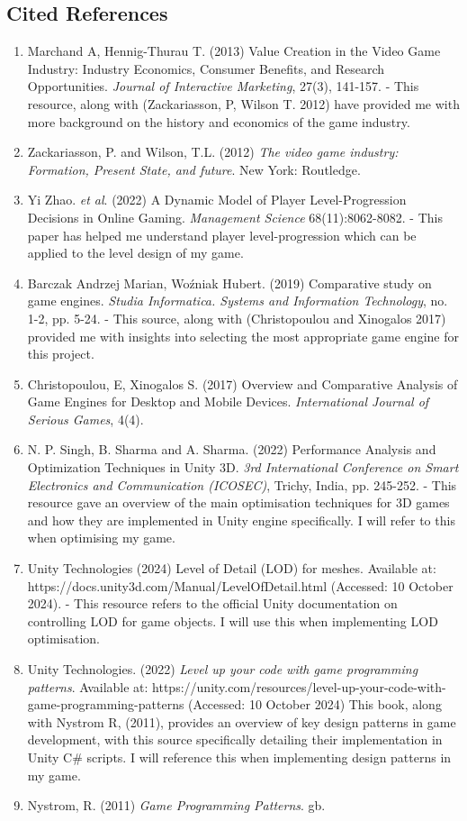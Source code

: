 \documentclass[12pt]{article}
\begin{document}
	\subsection{Cited References}
	\begin{enumerate}
	\item Marchand A, Hennig-Thurau T. (2013) Value Creation in the Video Game Industry: Industry Economics, Consumer Benefits, and Research Opportunities. \textit{Journal of Interactive Marketing}, 27(3), 141-157. - This resource, along with (Zackariasson, P, Wilson T. 2012) have provided me with more background on the history and economics of the game industry.
	\item Zackariasson, P. and Wilson, T.L. (2012) \textit{The video game industry: Formation, Present State, and future}. New York: Routledge.
	\item Yi Zhao. \textit{et al}. (2022) A Dynamic Model of Player Level-Progression Decisions in Online Gaming. \textit{Management Science} 68(11):8062-8082. - This paper has helped me understand player level-progression which can be applied to the level design of my game.
	\item Barczak Andrzej Marian, Woźniak Hubert. (2019) Comparative study on game engines. \textit{Studia Informatica. Systems and Information Technology}, no. 1-2, pp. 5-24. - This source, along with (Christopoulou and Xinogalos 2017) provided me with insights into selecting the most appropriate game engine for this project.
	\item Christopoulou, E, Xinogalos S. (2017) Overview and Comparative Analysis of Game Engines for Desktop and Mobile Devices. \textit{International Journal of Serious Games}, 4(4).
	\item N. P. Singh, B. Sharma and A. Sharma. (2022) Performance Analysis and Optimization Techniques in Unity 3D. \textit{3rd International Conference on Smart Electronics and Communication (ICOSEC)}, Trichy, India, pp. 245-252. - This resource gave an overview of the main optimisation techniques for 3D games and how they are implemented in Unity engine specifically. I will refer to this when optimising my game.
	\item Unity Technologies (2024) Level of Detail (LOD) for meshes. Available at: https://docs.unity3d.com/Manual/LevelOfDetail.html (Accessed: 10 October 2024). - This resource refers to the official Unity documentation on controlling LOD for game objects. I will use this when implementing LOD optimisation.
	\item Unity Technologies. (2022) \textit{Level up your code with game programming patterns}. Available at: https://unity.com/resources/level-up-your-code-with-game-programming-patterns (Accessed: 10 October 2024)  This book, along with Nystrom R, (2011), provides an overview of key design patterns in game development, with this source specifically detailing their implementation in Unity C\# scripts. I will reference this when implementing design patterns in my game.
	\item Nystrom, R. (2011) \textit{Game Programming Patterns}. gb.
	\end{enumerate}
\end{document}
